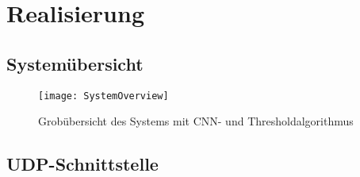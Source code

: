 \chapter{Realisierung}

\section{Systemübersicht}

\begin{figure}[H]
	\centering
	\texttt{[image: SystemOverview]}
	\caption{Grobübersicht des Systems mit CNN- und Thresholdalgorithmus}
	\label{SystemOverview}
\end{figure}

\section{UDP-Schnittstelle}


